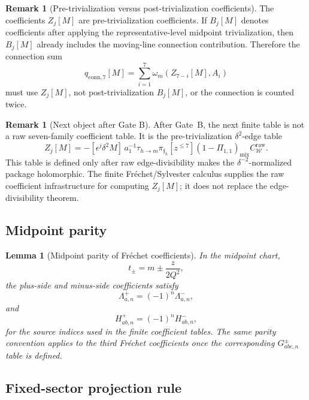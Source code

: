 \documentclass[11pt,a4paper]{amsart}
\theoremstyle{plain}
\newtheorem{lemma}[theorem]{Lemma}
\theoremstyle{definition}
\newtheorem{remark}[theorem]{Remark}
\begin{document}
\begin{remark}[Pre-trivialization versus post-trivialization coefficients]
\label{rem:pre-trivialization-versus-post-trivialization-coefficients}
The coefficients \(Z_j[M]\) are pre-trivialization coefficients.  If
\(B_j[M]\) denotes coefficients after applying the representative-level
midpoint trivialization, then \(B_j[M]\) already includes the moving-line
connection contribution.  Therefore the connection sum
\[
q_{\mathrm{conn},7}[M]
=
\sum_{i=1}^{7}\omega_m(Z_{7-i}[M],A_i)
\]
must use \(Z_j[M]\), not post-trivialization \(B_j[M]\), or the
connection is counted twice.
\end{remark}

\begin{remark}[Next object after Gate B]
\label{rem:next-object-after-gate-b}
After Gate~B, the next finite table is not a raw seven-family coefficient
table.  It is the pre-trivialization \(\delta^2\)-edge table
\[
Z_j[M]
=
-[\epsilon^j\delta^2M]\,
a_1^{-1}
\tau_{h\to m}\pi_{\mathfrak f_h}[z^{\le7}]
(1-\Pi_{1,1})_{\mathrm{mix}}C_{\mathcal W}^{\mathrm{raw}}.
\]
This table is defined only after raw edge-divisibility makes the
\(\delta^{-2}\)-normalized package holomorphic.  The finite
Fr\'echet/Sylvester calculus supplies the raw coefficient infrastructure
for computing \(Z_j[M]\); it does not replace the edge-divisibility
theorem.
\end{remark}

\subsection{Midpoint parity}
\label{subsec:midpoint-parity}

\begin{lemma}[Midpoint parity of Fr\'echet coefficients]
\label{lem:midpoint-parity-frechet-coefficients}
In the midpoint chart,
\[
t_\pm=m\pm\frac{z}{2Q^2},
\]
the plus-side and minus-side coefficients satisfy
\[
\Lambda^+_{a,n}=(-1)^n\Lambda^-_{a,n},
\]
and
\[
H^+_{ab,n}=(-1)^nH^-_{ab,n},
\]
for the source indices used in the finite coefficient tables.  The same
parity convention applies to the third Fr\'echet coefficients once the
corresponding \(G^\pm_{abc,n}\) table is defined.
\end{lemma}

\subsection{Fixed-sector projection rule}
\label{subsec:fixed-sector-projection-rule}
\end{document}
